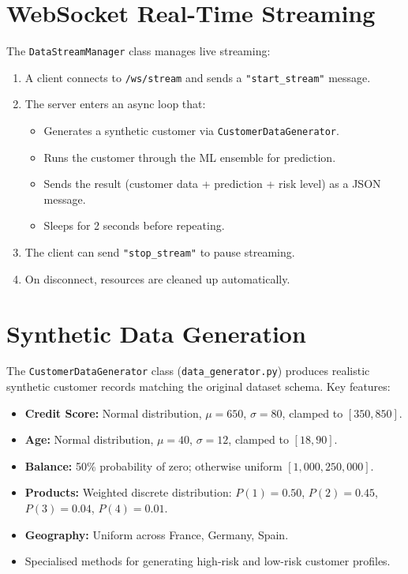 \documentclass[12pt, a4paper]{report}
\begin{document}
\section{WebSocket Real-Time Streaming}

The \texttt{DataStreamManager} class manages live streaming:

\begin{enumerate}
    \item A client connects to \texttt{/ws/stream} and sends a \texttt{"start\_stream"} message.
    \item The server enters an async loop that:
    \begin{itemize}
        \item Generates a synthetic customer via \texttt{CustomerDataGenerator}.
        \item Runs the customer through the ML ensemble for prediction.
        \item Sends the result (customer data + prediction + risk level) as a JSON message.
        \item Sleeps for 2 seconds before repeating.
    \end{itemize}
    \item The client can send \texttt{"stop\_stream"} to pause streaming.
    \item On disconnect, resources are cleaned up automatically.
\end{enumerate}

\section{Synthetic Data Generation}

The \texttt{CustomerDataGenerator} class (\texttt{data\_generator.py}) produces realistic synthetic customer records matching the original dataset schema. Key features:

\begin{itemize}
    \item \textbf{Credit Score:} Normal distribution, $\mu = 650$, $\sigma = 80$, clamped to $[350, 850]$.
    \item \textbf{Age:} Normal distribution, $\mu = 40$, $\sigma = 12$, clamped to $[18, 90]$.
    \item \textbf{Balance:} 50\% probability of zero; otherwise uniform $[1{,}000, 250{,}000]$.
    \item \textbf{Products:} Weighted discrete distribution: $P(1) = 0.50$, $P(2) = 0.45$, $P(3) = 0.04$, $P(4) = 0.01$.
    \item \textbf{Geography:} Uniform across France, Germany, Spain.
    \item Specialised methods for generating high-risk and low-risk customer profiles.
\end{itemize}
\end{document}
